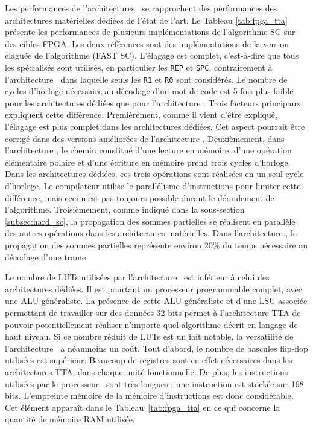 Les performances de l'architectures \TTSC~se rapprochent des performances des architectures matérielles dédiées de l'état de l'art. Le Tableau \ref{tab:fpga_tta} présente les performances de plusieurs implémentations de l'algorithme SC sur des cibles FPGA. Les deux références \cite{sarkis_fast_2014,giard_638_2015} sont des implémentations de la version élaguée de l'algorithme (FAST SC). L'élagage est complet, c'est-à-dire que tous les \noeuds spécialisés sont utilisés, en particulier les \noeuds \texttt{REP} et \texttt{SPC}, contrairement à l'architecture \TTSC~dans laquelle seuls les \noeuds \texttt{R1} et \texttt{R0} sont considérés. Le nombre de cycles d'horloge nécessaire au décodage d'un mot de code est 5 fois plus faible pour les architectures dédiées que pour l'architecture \TTSC. Trois facteurs principaux expliquent cette différence. Premièrement, comme il vient d'être expliqué, l'élagage est plus complet dans les architectures dédiées. Cet aspect pourrait être corrigé dans des versions améliorées de l'architecture \TTSC. Deuxièmement, dans l'architecture \TTSC, le chemin constitué d'une lecture en mémoire, d'une opération élémentaire polaire et d'une écriture en mémoire prend trois cycles d'horloge. Dans les architectures dédiées, ces trois opérations sont réalisées en un seul cycle d'horloge. Le compilateur utilise le parallélisme d'instructions pour limiter cette différence, mais ceci n'est pas toujours possible durant le déroulement de l'algorithme. Troisièmement, comme indiqué dans la sous-section \ref{subsec:hard_sc}, la propagation des sommes partielles se réalisent en parallèle des autres opérations dans les architectures matérielles. Dans l'architecture \TTSC, la propagation des sommes partielles représente environ 20\% du temps nécessaire au décodage d'une trame


Le nombre de LUTs utilisées par l'architecture \TTSC~est inférieur à celui des architectures dédiées. Il est pourtant un processeur programmable complet, avec une ALU généraliste. La présence de cette ALU généraliste et d'une LSU associée permettant de travailler sur des données 32 bits permet à l'architecture TTA de pouvoir potentiellement réaliser n'importe quel algorithme décrit en langage de haut niveau. Si ce nombre réduit de LUTs est un fait notable, la versatilité de l'architecture \TTSC~a néanmoins un coût. Tout d'abord, le nombre de bascules flip-flop utilisées est supérieur. Beaucoup de registres sont en effet nécessaires dans les architectures TTA, dans chaque unité fonctionnelle. De plus, les instructions utilisées par le processeur \TTSC~sont très longues : une instruction est stockée sur 198 bits. L'empreinte mémoire de la mémoire d'instructions est donc considérable. Cet élément apparaît dans le Tableau~\ref{tab:fpga_tta} en ce qui concerne la quantité de mémoire RAM utilisée.



